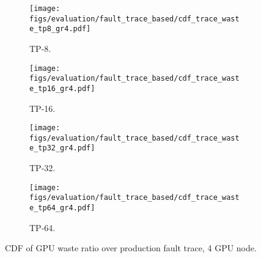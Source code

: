 \begin{figure*}[h!t]
    \centering
    \begin{subfigure}[b]{0.23\linewidth}
        \centering
        \texttt{[image: figs/evaluation/fault\_trace\_based/cdf\_trace\_waste\_tp8\_gr4.pdf]}
        \caption{TP-8.}
        \label{fig:simulation:waste-cdf:tp8-gr4}
    \end{subfigure}
    \hspace{2pt}
    \begin{subfigure}[b]{0.23\linewidth}
        \centering
        \texttt{[image: figs/evaluation/fault\_trace\_based/cdf\_trace\_waste\_tp16\_gr4.pdf]}
        \caption{TP-16.}
        \label{fig:simulation:waste-cdf:tp16-gr4}
    \end{subfigure}
    \hspace{2pt}
    \begin{subfigure}[b]{0.23\linewidth}
        \centering
        \texttt{[image: figs/evaluation/fault\_trace\_based/cdf\_trace\_waste\_tp32\_gr4.pdf]}
        \caption{TP-32.}
        \label{fig:simulation:waste-cdf:tp32-gr4}
    \end{subfigure}
    \hspace{2pt}
    \begin{subfigure}[b]{0.23\linewidth}
        \centering
        \texttt{[image: figs/evaluation/fault\_trace\_based/cdf\_trace\_waste\_tp64\_gr4.pdf]}
        \caption{TP-64.}
        \label{fig:simulation:waste-cdf:tp64-gr4}
    \end{subfigure}
    \vspace{-1ex}
    \caption{CDF of GPU waste ratio over production fault trace, 4 GPU node.}
    \label{fig:simulation:waste-cdf:gr4:supple}
\end{figure*}


